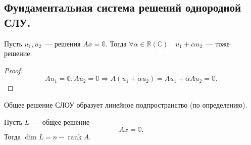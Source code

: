 \documentclass[10pt]{article}
\begin{document}
\subsection*{Фундаментальная система решений однородной СЛУ.}

\begin{theorem} \label{th:linsol}
    Пусть $u_1, u_2$~--- решения $Ax = \mathbb{0}$. Тогда $\forall \alpha \in \mathbb{R}(\mathbb{C}) \quad u_1 + \alpha u_2$~--- тоже решение.
\end{theorem}
\begin{proof}
$$
    A u_1 = \mathbb{0}, A u_2 = \mathbb{0} \Rightarrow A (u_1 + \alpha u_2) = A u_1 + \alpha A u_2 = \mathbb{0}.
$$
\end{proof}

\begin{corollary}
    Общее решение СЛОУ образует линейное подпространство (по определению).
\end{corollary}

\begin{theorem}
    Пусть $L$~--- общее решение \begin{equation} \tag{1}\label{eq:sistema1}
        Ax = \mathbb{0}\text{.}
    \end{equation}
    Тогда $\operatorname{dim}L = n - \operatorname{rank} A$.
\end{theorem}
\end{document}
